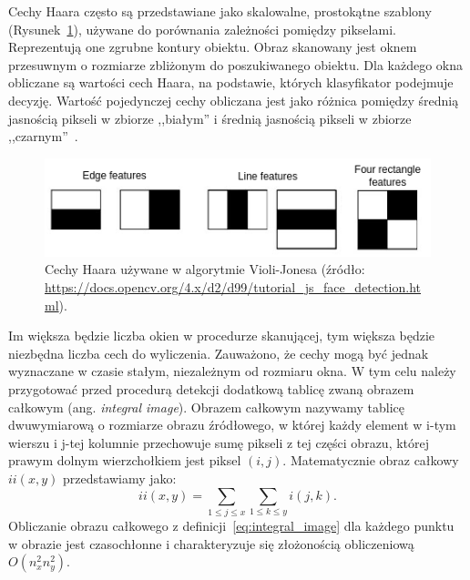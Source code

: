 Cechy Haara często są przedstawiane jako skalowalne, prostokątne szablony (Rysunek~\ref{fig:haar_feats}), używane do porównania zależności pomiędzy pikselami.
Reprezentują one zgrubne kontury obiektu.
Obraz skanowany jest oknem przesuwnym o rozmiarze zbliżonym do poszukiwanego obiektu.
Dla każdego okna obliczane są wartości cech Haara, na podstawie, których klasyfikator podejmuje decyzję.
Wartość pojedynczej cechy obliczana jest jako różnica pomiędzy średnią jasnością pikseli w zbiorze ,,białym'' i średnią jasnością pikseli w zbiorze ,,czarnym''~\cite{szybka_detekcja_klesk}.
\begin{figure}[!ht]
    \centering
    \includegraphics[scale=0.6]{Pictures/haar_feats}
    \caption{Cechy Haara używane w algorytmie Violi-Jonesa (źródło: \url{https://docs.opencv.org/4.x/d2/d99/tutorial_js_face_detection.html}).}
    \label{fig:haar_feats}
\end{figure}
\FloatBarrier
Im większa będzie liczba okien w procedurze skanującej, tym większa będzie niezbędna liczba cech do wyliczenia.
Zauważono, że cechy mogą być jednak wyznaczane w czasie stałym, niezależnym od rozmiaru okna.
W tym celu należy przygotować przed procedurą detekcji dodatkową tablicę zwaną obrazem całkowym (ang. \textit{integral image}).
Obrazem całkowym nazywamy tablicę dwuwymiarową o rozmiarze obrazu źródłowego, w której każdy element w i-tym wierszu i j-tej kolumnie przechowuje sumę pikseli z tej części obrazu, której prawym dolnym wierzchołkiem jest piksel $(i, j)$.
Matematycznie obraz całkowy $ii(x,y)$ przedstawiamy jako:
\begin{equation}
    \label{eq:integral_image}
    ii(x,y) = \sum_{1\leq j \leq x} \sum_{1\leq k \leq y} i(j,k).
\end{equation}
Obliczanie obrazu całkowego z definicji~\eqref{eq:integral_image} dla każdego punktu w obrazie jest czasochłonne i charakteryzuje się złożonością obliczeniową $O(n_x^2 n_y^2)$.
